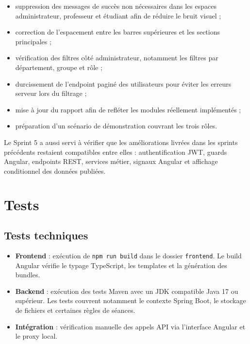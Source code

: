 \documentclass[12pt,a4paper]{report}
\begin{document}
\begin{itemize}[itemsep=0.4em]
    \item suppression des messages de succès non nécessaires dans les espaces administrateur, professeur et étudiant afin de réduire le bruit visuel ;
    \item correction de l'espacement entre les barres supérieures et les sections principales ;
    \item vérification des filtres côté administrateur, notamment les filtres par département, groupe et rôle ;
    \item durcissement de l'endpoint paginé des utilisateurs pour éviter les erreurs serveur lors du filtrage ;
    \item mise à jour du rapport afin de refléter les modules réellement implémentés ;
    \item préparation d'un scénario de démonstration couvrant les trois rôles.
\end{itemize}

Le Sprint 5 a aussi servi à vérifier que les améliorations livrées dans les sprints précédents restaient compatibles entre elles : authentification JWT, guards Angular, endpoints REST, services métier, signaux Angular et affichage conditionnel des données publiées.

\section{Tests}

\subsection*{Tests techniques}

\begin{itemize}[itemsep=0.4em]
    \item \textbf{Frontend} : exécution de \texttt{npm run build} dans le dossier \texttt{frontend}. Le build Angular vérifie le typage TypeScript, les templates et la génération des bundles.
    \item \textbf{Backend} : exécution des tests Maven avec un JDK compatible Java 17 ou supérieur. Les tests couvrent notamment le contexte Spring Boot, le stockage de fichiers et certaines règles de séances.
    \item \textbf{Intégration} : vérification manuelle des appels API via l'interface Angular et le proxy local.
\end{itemize}
\end{document}
